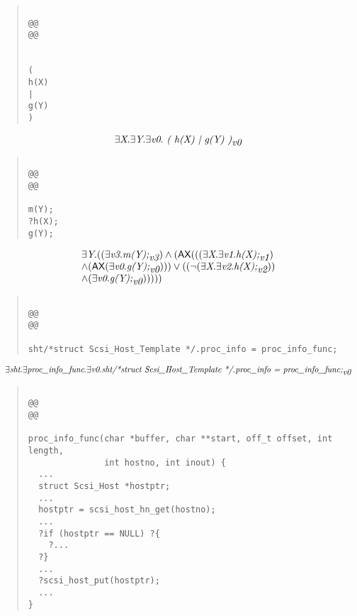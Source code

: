 \documentclass{article}
\newcommand{\AX}{\mbox{\sf{AX}}}
\newcommand{\mita}[1]{\mbox{\it{{#1}}}}
\begin{document}
\begin{quote}\begin{verbatim}

@@
@@


(
h(X)
|
g(Y)
)
\end{verbatim}\end{quote}

\[\begin{array}{l}
\exists \mita{X} . \exists \mita{Y} . \exists \mita{v0} . \mita{
(
h(X)
|
g(Y)
)}_{\mita{v0}}
\end{array}\]

\begin{quote}\begin{verbatim}

@@
@@

m(Y);
?h(X);
g(Y);
\end{verbatim}\end{quote}

\[\begin{array}{l}
\exists \mita{Y} . ((\exists \mita{v3} . \mita{m(Y);}_{\mita{v3}}) \wedge (\AX(((\exists \mita{X} . \exists \mita{v1} . \mita{h(X);}_{\mita{v1}})\\ \wedge (\AX(\exists \mita{v0} . \mita{g(Y);}_{\mita{v0}}))) \vee ((\neg (\exists \mita{X} . \exists \mita{v2} . \mita{h(X);}_{\mita{v2}}))\\ \wedge (\exists \mita{v0} . \mita{g(Y);}_{\mita{v0}})))))
\end{array}\]

\begin{quote}\begin{verbatim}

@@
@@

sht/*struct Scsi_Host_Template */.proc_info = proc_info_func;
\end{verbatim}\end{quote}

\[\begin{array}{l}
\exists \mita{sht} . \exists \mita{proc\_info\_func} . \exists \mita{v0} . \mita{sht/*struct Scsi\_Host\_Template */.proc\_info = proc\_info\_func;}_{\mita{v0}}
\end{array}\]

\begin{quote}\begin{verbatim}

@@
@@

proc_info_func(char *buffer, char **start, off_t offset, int length,
               int hostno, int inout) {
  ...
  struct Scsi_Host *hostptr;
  ...
  hostptr = scsi_host_hn_get(hostno);
  ...
  ?if (hostptr == NULL) ?{
    ?...
  ?}
  ...
  ?scsi_host_put(hostptr);
  ...
}
\end{verbatim}\end{quote}
\end{document}

